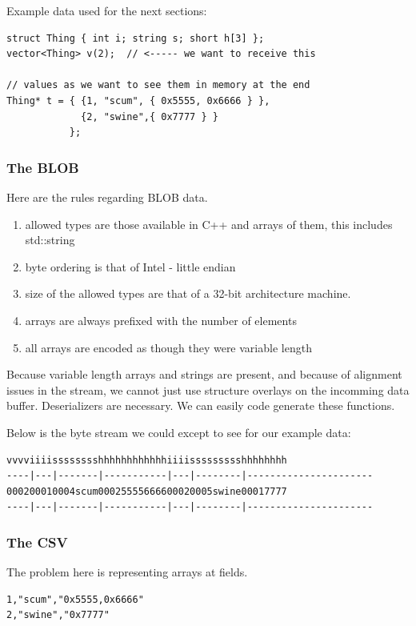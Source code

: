 Example data used for the next sections:
\begin{verbatim}
struct Thing { int i; string s; short h[3] };
vector<Thing> v(2);  // <----- we want to receive this

// values as we want to see them in memory at the end
Thing* t = { {1, "scum", { 0x5555, 0x6666 } },
             {2, "swine",{ 0x7777 } }
           };
\end{verbatim}

\subsubsection{The BLOB}
Here are the rules regarding BLOB data.

\begin{enumerate}
\item allowed types are those available in C++ and arrays of them, this includes std::string
\item byte ordering is that of Intel - little endian
\item size of the allowed types are that of a 32-bit architecture machine.
\item arrays are always prefixed with the number of elements
\item all arrays are encoded as though they were variable length
\end{enumerate}

Because variable length arrays and strings are present, and because of
alignment issues in the stream, we cannot just use structure overlays
on the incomming data buffer.  Deserializers are necessary.  We can easily code
generate these functions.

Below is the byte stream we could except to see for our example data:

\begin{verbatim}
vvvviiiisssssssshhhhhhhhhhhhiiiissssssssshhhhhhhh
----|---|-------|-----------|---|--------|----------------------
000200010004scum00025555666600020005swine00017777
----|---|-------|-----------|---|--------|----------------------
\end{verbatim}

\subsubsection{The CSV}
The problem here is representing arrays at fields. 
\begin{verbatim}
1,"scum","0x5555,0x6666"
2,"swine","0x7777"
\end{verbatim}

